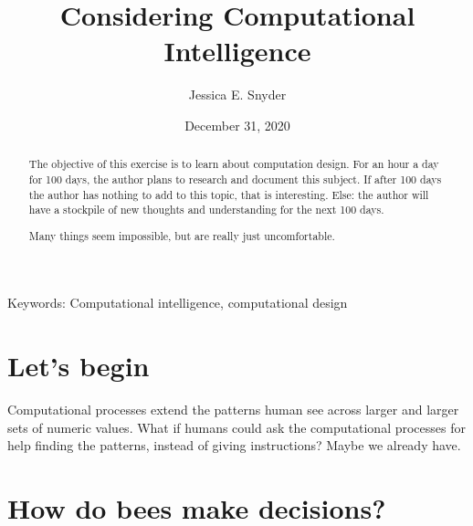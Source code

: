\documentclass[a4paper,11pt]{article}
\begin{document}
\title{Considering Computational Intelligence}
\author{Jessica E. Snyder}
\date{December 31, 2020}
\maketitle

\begin{abstract}
The objective of this exercise is to learn about computation design. For an hour a day for 100 days, the author plans to research and document this subject. If after 100 days the author has nothing to add to this topic, that is interesting. Else: the author will have a stockpile of new thoughts and understanding for the next 100 days.

Many things seem impossible, but are really just uncomfortable. 

\end{abstract}

Keywords: Computational intelligence, computational design

\tableofcontents

\section{Let's begin}
Computational processes extend the patterns human see across larger and larger sets of numeric values. What if humans could ask the computational processes for help finding the patterns, instead of giving instructions? Maybe we already have. 
 


\section{How do bees make decisions?}
\end{document}
